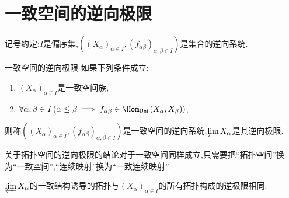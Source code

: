 \section{一致空间的逆向极限}

记号约定:$I$是偏序集,$\left(\left(X_{\alpha}\right)_{\alpha\in I},\left(f_{\alpha\beta}\right)_{\alpha,\beta\in I}\right)$是集合的逆向系统.

\begin{definition}{一致空间的逆向极限}{}
	如果下列条件成立:
	\begin{enumerate}
		\item $\left(X_{\alpha}\right)_{\alpha\in I}$是一致空间族,
		\item $\forall\alpha,\beta\in I\left(\alpha\leq\beta\implies f_{\alpha\beta}\in\Hom_{\mathsf{Uni}}\left(X_{\alpha},X_{\beta}\right)\right)$,
	\end{enumerate}
	则称$\left(\left(X_{\alpha}\right)_{\alpha\in I},\left(f_{\alpha\beta}\right)_{\alpha,\beta\in I}\right)$是一致空间的逆向系统,$\varprojlim X_{\alpha}$是其逆向极限.
\end{definition}

\begin{remark}{}{}
	关于拓扑空间的逆向极限的结论对于一致空间同样成立,只需要把``拓扑空间''换为``一致空间'',``连续映射''换为``一致连续映射''.
\end{remark}

\begin{remark}{}{}
	$\varprojlim X_{\alpha}$的一致结构诱导的拓扑与$\left(X_{\alpha}\right)_{\alpha\in I}$的所有拓扑构成的逆极限相同.
\end{remark}